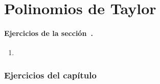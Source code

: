 
\chapter{Polinomios de Taylor}


\subsubsection*{Ejercicios de la sección~.}

\begin{enumerate}
\item 
\end{enumerate}

\subsection*{Ejercicios del capítulo~}



